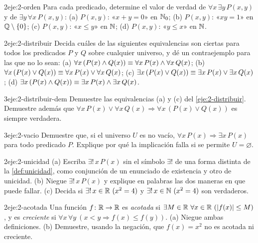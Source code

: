 \begin{ejercicio}{2}{eje:2-orden}
Para cada predicado, determine el valor de verdad de $\forall x\,\exists y\,P(x,y)$ y de $\exists y\,\forall x\,P(x,y)$: (a) $P(x,y)$: «$x+y=0$» en $\mathbb{N}_0$; (b) $P(x,y)$: «$xy=1$» en $\mathbb{Q}\setminus\{0\}$; (c) $P(x,y)$: «$x\le y$» en $\mathbb{N}$; (d) $P(x,y)$: «$y\le x$» en $\mathbb{N}$.
\end{ejercicio}

\begin{ejercicio}{2}{eje:2-distribuir}
Decida cuáles de las siguientes equivalencias son ciertas para todos los predicados $P$ y $Q$ sobre cualquier universo, y dé un contraejemplo para las que no lo sean: (a) $\forall x\,(P(x)\wedge Q(x))\equiv\forall x\,P(x)\wedge\forall x\,Q(x)$; (b) $\forall x\,(P(x)\vee Q(x))\equiv\forall x\,P(x)\vee\forall x\,Q(x)$; (c) $\exists x\,(P(x)\vee Q(x))\equiv\exists x\,P(x)\vee\exists x\,Q(x)$; (d) $\exists x\,(P(x)\wedge Q(x))\equiv\exists x\,P(x)\wedge\exists x\,Q(x)$.
\end{ejercicio}

\begin{ejercicio}{3}{eje:2-distribuir-dem}
Demuestre las equivalencias (a) y (c) del \cref{eje:2-distribuir}. Demuestre además que $\forall x\,P(x)\vee\forall x\,Q(x)\Rightarrow\forall x\,(P(x)\vee Q(x))$ es siempre verdadera.
\end{ejercicio}

\begin{ejercicio}{3}{eje:2-vacio}
Demuestre que, si el universo $U$ es no vacío, $\forall x\,P(x)\Rightarrow\exists x\,P(x)$ para todo predicado $P$. Explique por qué la implicación falla si se permite $U=\varnothing$.
\end{ejercicio}

\begin{ejercicio}{2}{eje:2-unicidad}
(a) Escriba $\exists!\,x\,P(x)$ sin el símbolo $\exists!$ de una forma distinta de la \cref{def:unicidad}, como conjunción de un enunciado de existencia y otro de unicidad. (b) Niegue $\exists!\,x\,P(x)$ y explique en palabras las dos maneras en que puede fallar. (c) Decida si $\exists!\,x\in\mathbb{R}\ (x^{2}=4)$ y $\exists!\,x\in\mathbb{N}\ (x^{2}=4)$ son verdaderos.
\end{ejercicio}

\begin{ejercicio}{2}{eje:2-acotada}
Una función $f\colon\mathbb{R}\to\mathbb{R}$ es \emph{acotada} si $\exists M\in\mathbb{R}\ \forall x\in\mathbb{R}\ (\lvert f(x)\rvert\le M)$, y es \emph{creciente} si $\forall x\,\forall y\ (x<y\Rightarrow f(x)\le f(y))$. (a) Niegue ambas definiciones. (b) Demuestre, usando la negación, que $f(x)=x^{2}$ no es acotada ni creciente.
\end{ejercicio}

